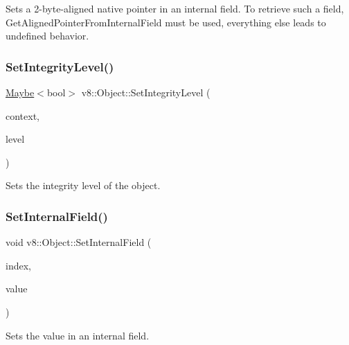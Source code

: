 Sets a 2-\/byte-\/aligned native pointer in an internal field. To retrieve such a field, Get\+Aligned\+Pointer\+From\+Internal\+Field must be used, everything else leads to undefined behavior. \mbox{\label{classv8_1_1Object_ac45163422a18bb7481cc78fcacecb301}} 
\subsubsection{\texorpdfstring{Set\+Integrity\+Level()}{SetIntegrityLevel()}}
{\footnotesize\ttfamily \mbox{\hyperlink{classv8_1_1Maybe}{Maybe}}$<$bool$>$ v8\+::\+Object\+::\+Set\+Integrity\+Level (\begin{DoxyParamCaption}\item[{\mbox{\hyperlink{classv8_1_1Local}{Local}}$<$ \mbox{\hyperlink{classv8_1_1Context}{Context}} $>$}]{context,  }\item[{\mbox{\hyperlink{namespacev8_a02642d03ff1eecc2fd358626499c2e30}{Integrity\+Level}}}]{level }\end{DoxyParamCaption})}

Sets the integrity level of the object. \mbox{\label{classv8_1_1Object_aebf949a0592cebc144bb2f96bfb7ec72}} 
\subsubsection{\texorpdfstring{Set\+Internal\+Field()}{SetInternalField()}}
{\footnotesize\ttfamily void v8\+::\+Object\+::\+Set\+Internal\+Field (\begin{DoxyParamCaption}\item[{int}]{index,  }\item[{\mbox{\hyperlink{classv8_1_1Local}{Local}}$<$ \mbox{\hyperlink{classv8_1_1Value}{Value}} $>$}]{value }\end{DoxyParamCaption})}

Sets the value in an internal field. \mbox{\label{classv8_1_1Object_a607c24e5ffc2c1de1f0f793d75f3d650}} 

